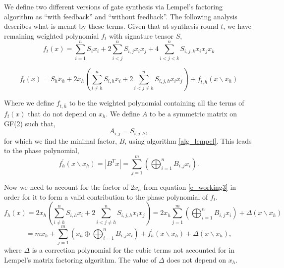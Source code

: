 \documentclass{article}
\theoremstyle{definition}
\theoremstyle{problem}
\theoremstyle{lemma}
\begin{document}
		 
		
		We define two different versions of gate synthesis via Lempel's factoring algorithm as ``with feedback'' and ``without feedback''. The following analysis describes what is meant by these terms. Given that at synthesis round $t$, we have remaining weighted polynomial $f_t$ with signature tensor $S$,
		\begin{equation}
		f_t(x) = \sum_{i=1}^n S_{i}x_i + 2\sum_{i<j}^n S_{i,j}x_i x_j + 4 \sum_{i<j<k}^n S_{i,j,k}x_i x_j x_k
		\end{equation}
		
		\begin{equation}
		\label{e_working3}
		f_t(x) = S_h x_h + 2x_h\left(\sum_{i\neq h}^n S_{i,h} x_i + 2\sum_{i<j\neq h}^n S_{i,j,h}x_i x_j\right) + f_{t,\bar{h}}(x\backslash x_h)
		\end{equation}
		
		Where we define $f_{t,\bar{h}}$ to be the weighted polynomial containing all the terms of $f_t(x)$ that do not depend on $x_h$. We define $A$ to be a symmetric matrix on GF(2) such that,
		\begin{equation}
		A_{i,j} = S_{i,j,h},
		\end{equation}
		for which we find the minimal factor, $B$, using algorithm \ref{alg_lempel}. This leads to the phase polynomial,
		\begin{equation}
		f^\prime_{h}(x\backslash x_h) = |B^Tx| = \sum_{j=1}^m\left(\bigoplus_{i=1}^n B_{i,j}x_i\right).
		\end{equation}
		
		Now we need to account for the factor of $2x_h$ from equation \ref{e_working3} in order for it to form a valid contribution to the phase polynomial of $f_t$.
		\begin{equation}
		f_h(x) = 2x_h\left(\sum_{i\neq h}^n S_{i,h} x_i + 2\sum_{i<j\neq h}^n S_{i,j,h}x_i x_j\right) = 2x_h\sum_{j=1}^m\left(\bigoplus_{i=1}^n B_{i,j}x_i\right) + \Delta(x\backslash x_h)
		\end{equation}		
		\begin{equation}
		\label{e_working4}
		= mx_h+\sum_{j=1}^m\left(x_h\oplus\bigoplus_{i=1}^n B_{i,j}x_i\right)+ f^\prime_h(x\backslash x_h) + \Delta(x\backslash x_h),
		\end{equation}
		where $\Delta$ is a correction polynomial for the cubic terms not accounted for in Lempel's matrix factoring algorithm. The value of $\Delta$ does not depend on $x_h$.
		
\end{document}
